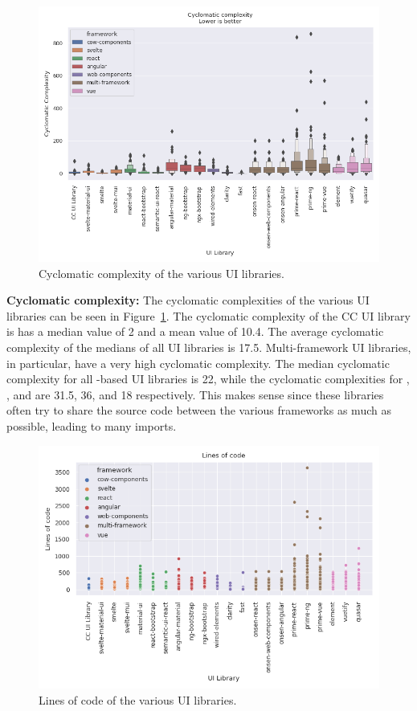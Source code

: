 \begin{figure}[htbp]
  \includegraphics[width=\columnwidth]{plots/cyclomatic-complexity.png}
  \caption{Cyclomatic complexity of the various UI libraries.}
  \label{fig:results:cyclomatic-complexity}
  \centering
\end{figure}

\textbf{Cyclomatic complexity:} The cyclomatic complexities of the various UI libraries can be seen in Figure~\ref{fig:results:cyclomatic-complexity}. The cyclomatic complexity of the CC UI library is has a median value of 2 and a mean value of 10.4. The average cyclomatic complexity of the medians of all UI libraries is 17.5. Multi-framework UI libraries, in particular, have a very high cyclomatic complexity. The median cyclomatic complexity for all -based UI libraries is 22, while the cyclomatic complexities for , , and  are 31.5, 36, and 18 respectively. This makes sense since these libraries often try to share the source code between the various frameworks as much as possible, leading to many imports.

\begin{figure}[htbp]
  \includegraphics[width=\columnwidth]{plots/lines-of-code.png}
  \caption{Lines of code of the various UI libraries.}
  \label{fig:results:lines-of-code}
  \centering
\end{figure}

